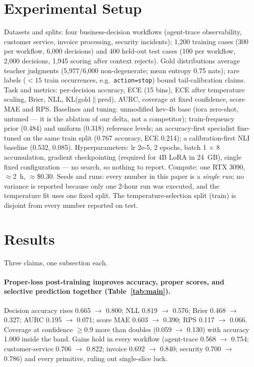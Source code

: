 \section{Experimental Setup}

Datasets and splits: four business-decision workflows (agent-trace
observability, customer service, invoice processing, security incidents);
1,200 training cases (300 per workflow, 6,000 decisions) and 400 held-out
test cases (100 per workflow, 2,000 decisions, 1,945 scoring after context
rejects). Gold distributions average teacher judgments (5,977/6,000
non-degenerate; mean entropy 0.75 nats); rare labels ($<15$ train
occurrences, e.g.\ \texttt{action=stop}) bound tail-calibration claims.
Task and metrics: per-decision accuracy, ECE (15 bins), ECE after
temperature scaling, Brier, NLL, KL(gold$\|$pred), AURC, coverage at fixed
confidence, score MAE and RPS. Baselines and tuning: unmodified kev-4b base
(iora zero-shot, untuned — it is the ablation of our delta, not a
competitor); train-frequency prior (0.484) and uniform (0.318) reference
levels; an accuracy-first specialist fine-tuned on the same train split
(0.767 accuracy, ECE 0.214); a calibration-first NLI baseline (0.532,
0.085). Hyperparameters: lr 2e-5, 2 epochs, batch 1 $\times$ 8
accumulation, gradient checkpointing (required for 4B LoRA in 24~GB),
single fixed configuration — no search, so nothing to report. Compute: one
RTX 3090, $\approx$2~h, $\approx$\$0.30. Seeds and runs: every number in
this paper is a \emph{single run}; no variance is reported because only one
2-hour run was executed, and the temperature fit uses one fixed split. The
temperature-selection split (train) is disjoint from every number reported
on test.

\section{Results}

Three claims, one subsection each.

\paragraph{Proper-loss post-training improves accuracy, proper scores, and
selective prediction together (Table~\ref{tab:main}).} Decision accuracy
rises 0.665 $\to$ 0.800; NLL 0.819 $\to$ 0.576; Brier 0.468 $\to$ 0.327;
AURC 0.195 $\to$ 0.071; score MAE 0.603 $\to$ 0.390; RPS 0.117 $\to$ 0.066.
Coverage at confidence $\ge 0.9$ more than doubles (0.059 $\to$ 0.130) with
accuracy 1.000 inside the band. Gains hold in every workflow
(agent-trace 0.568 $\to$ 0.754; customer-service 0.706 $\to$ 0.822; invoice
0.692 $\to$ 0.840; security 0.700 $\to$ 0.786) and every primitive,
ruling out single-slice luck.

